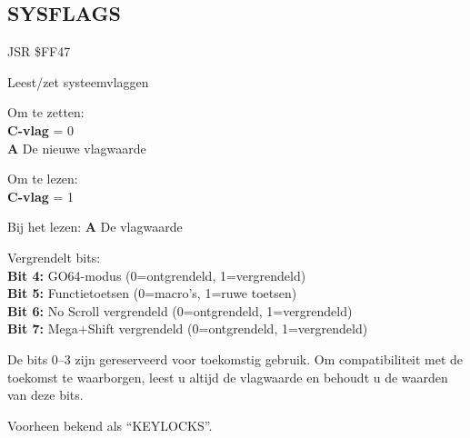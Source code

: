 
\newpage
\subsection{SYSFLAGS}
\label{KERNAL Jump Table!SYSFLAGS}
\begin{description}[leftmargin=2cm,style=nextline]
    \item [Adres:] JSR \$FF47    \item [Omschrijving:] Leest/zet systeemvlaggen    \item [Invoer:]        Om te zetten: \\        \textbf{C-vlag} = 0 \\        \textbf{A} De nieuwe vlagwaarde

        Om te lezen: \\        \textbf{C-vlag} = 1    \item [Uitvoer:]        Bij het lezen:        \textbf{A} De vlagwaarde    \item [Opmerkingen:]        Vergrendelt bits: \\        \textbf{Bit 4:} GO64-modus (0=ontgrendeld, 1=vergrendeld) \\        \textbf{Bit 5:} Functietoetsen (0=macro's, 1=ruwe toetsen) \\        \textbf{Bit 6:} No Scroll vergrendeld (0=ontgrendeld, 1=vergrendeld) \\        \textbf{Bit 7:} Mega+Shift vergrendeld (0=ontgrendeld, 1=vergrendeld)

        De bits 0--3 zijn gereserveerd voor toekomstig gebruik. Om compatibiliteit met de toekomst te waarborgen, leest u altijd de vlagwaarde en behoudt u de waarden van deze bits.

        Voorheen bekend als ``KEYLOCKS''.

    \item [Voorbeeld:]

\end{description}



\newpage
